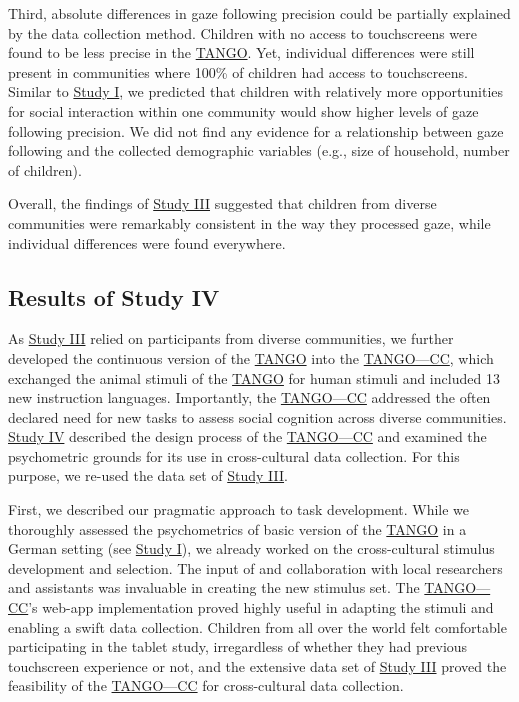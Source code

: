 \documentclass[
]{scrbook}
\begin{document}
Third, absolute differences in gaze following precision could be partially explained by the data collection method. Children with no access to touchscreens were found to be less precise in the \hyperref[acronyms_TANGO]{TANGO}. Yet, individual differences were still present in communities where 100\% of children had access to touchscreens. Similar to \hyperref[studyI]{Study I}, we predicted that children with relatively more opportunities for social interaction within one community would show higher levels of gaze following precision. We did not find any evidence for a relationship between gaze following and the collected demographic variables (e.g., size of household, number of children).

Overall, the findings of \hyperref[studyIII]{Study III} suggested that children from diverse communities were remarkably consistent in the way they processed gaze, while individual differences were found everywhere.

\subsection{Results of Study IV}\label{resultsIV}

As \hyperref[studyIII]{Study III} relied on participants from diverse communities, we further developed the continuous version of the \hyperref[acronyms_TANGO]{TANGO} into the \hyperref[acronyms_TANGOux2014CC]{TANGO---CC}, which exchanged the animal stimuli of the \hyperref[acronyms_TANGO]{TANGO} for human stimuli and included 13 new instruction languages. Importantly, the \hyperref[acronyms_TANGOux2014CC]{TANGO---CC} addressed the often declared need for new tasks to assess social cognition across diverse communities. \hyperref[studyIV]{Study IV} described the design process of the \hyperref[acronyms_TANGOux2014CC]{TANGO---CC} and examined the psychometric grounds for its use in cross-cultural data collection. For this purpose, we re-used the data set of \hyperref[studyIII]{Study III}.

First, we described our pragmatic approach to task development. While we thoroughly assessed the psychometrics of basic version of the \hyperref[acronyms_TANGO]{TANGO} in a German setting (see \hyperref[studyI]{Study I}), we already worked on the cross-cultural stimulus development and selection. The input of and collaboration with local researchers and assistants was invaluable in creating the new stimulus set. The \hyperref[acronyms_TANGOux2014CC]{TANGO---CC}'s web-app implementation proved highly useful in adapting the stimuli and enabling a swift data collection. Children from all over the world felt comfortable participating in the tablet study, irregardless of whether they had previous touchscreen experience or not, and the extensive data set of \hyperref[studyIII]{Study III} proved the feasibility of the \hyperref[acronyms_TANGOux2014CC]{TANGO---CC} for cross-cultural data collection.
\end{document}
